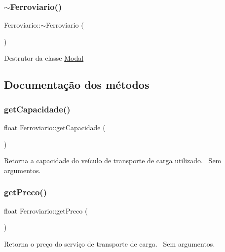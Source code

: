 \subsubsection{\texorpdfstring{$\sim$\+Ferroviario()}{~Ferroviario()}}
{\footnotesize\ttfamily Ferroviario\+::$\sim$\+Ferroviario (\begin{DoxyParamCaption}{ }\end{DoxyParamCaption})}

Destrutor da classe \hyperlink{classModal}{Modal}

\subsection{Documentação dos métodos}
\mbox{\label{classFerroviario_a990ce4dac67327abd75d66f94bf5d358}} 
\subsubsection{\texorpdfstring{get\+Capacidade()}{getCapacidade()}}
{\footnotesize\ttfamily float Ferroviario\+::get\+Capacidade (\begin{DoxyParamCaption}{ }\end{DoxyParamCaption})}

Retorna a capacidade do veículo de transporte de carga utilizado.~\newline
Sem argumentos.\mbox{\label{classFerroviario_a2face4e080b96591614237d88bda094c}} 
\subsubsection{\texorpdfstring{get\+Preco()}{getPreco()}}
{\footnotesize\ttfamily float Ferroviario\+::get\+Preco (\begin{DoxyParamCaption}{ }\end{DoxyParamCaption})}

Retorna o preço do serviço de transporte de carga.~\newline
Sem argumentos.\mbox{\label{classFerroviario_a6d75f014c46c8c24ed2c121baa1cda0b}} 
